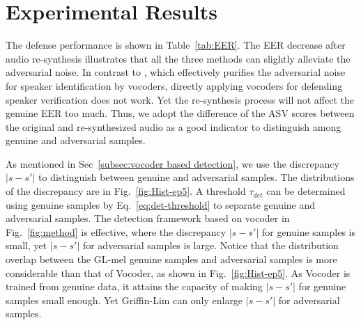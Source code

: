 
\section{Experimental Results}
\label{sec:expt-rst}

\begin{table}[t]
\centering
\caption{AUC with different $\epsilon$}
\label{tab:AUC}
\end{table}




The defense performance is shown in Table~\ref{tab:EER}.
The EER decrease after audio re-synthesis illustrates that all the three methods can slightly alleviate the adversarial noise.
In contrast to \cite{joshi2021adversarial}, which effectively purifies the adversarial noise for speaker identification by vocoders, directly applying vocoders for defending speaker verification does not work.
Yet the re-synthesis process will not affect the genuine EER too much. 
Thus, we adopt the difference of the ASV scores between the original and re-synthesized audio as a good indicator to distinguish among genuine and adversarial samples. 

As mentioned in Sec~\ref{subsec:vocoder based detection}, we use the discrepancy $|s-s'|$ to distinguish between genuine and adversarial samples.
The distributions of the discrepancy are in Fig.~\ref{fig:Hist-ep5}.
A threshold $\tau_{det}$ can be determined using genuine samples by Eq.~\ref{eq:det-threshold} to separate genuine and adversarial samples.
The detection framework based on vocoder in Fig.~\ref{fig:method} is effective, where the discrepancy $|s-s'|$ for genuine samples is small, yet $|s-s'|$ for adversarial samples is large.
Notice that the distribution overlap between the GL-mel genuine samples and adversarial samples is more considerable than that of Vocoder, as shown in Fig.~\ref{fig:Hist-ep5}.
As Vocoder is trained from genuine data, it attains the capacity of making $|s-s'|$ for genuine samples small enough.
Yet Griffin-Lim can only enlarge $|s-s'|$ for adversarial samples.

